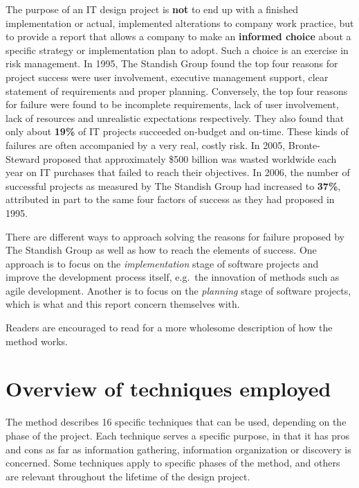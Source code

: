 The purpose of an IT design project is \textbf{not} to end up with a
finished implementation or actual, implemented alterations to company work
practice, but to provide a report that allows a company to make an
\textbf{informed choice} about a specific strategy or implementation plan to
adopt. Such a choice is an exercise in risk management. In 1995, The Standish
Group found the top four reasons for project success were user involvement,
executive management support, clear statement of requirements and proper
planning\cite{standish1995chaos}. Conversely, the top four reasons for failure
were found to be incomplete requirements, lack of user involvement, lack of
resources and unrealistic expectations respectively\cite{standish1995chaos}.
They also found that only about \textbf{19\%} of IT projects succeeded on-budget
and on-time. These kinds of failures are often accompanied by a very real, costly risk. 
In 2005, Bronte-Steward proposed that approximately \$500 billion was wasted
worldwide each year on IT purchases that failed to reach their
objectives\cite{bronte2005developing}. In 2006, the number of successful
projects as measured by The Standish Group\cite{standish2012} had increased to
\textbf{37\%}, attributed in part to the same four factors of success as they had
proposed in 1995. 

There are different ways to approach solving the reasons for
failure proposed by The Standish Group as well as how to reach the elements of
success. One approach is to focus on the \textit{implementation} stage of
software projects and improve the development process itself, e.g.\ the
innovation of methods such as agile development. Another is to focus on the
\textit{planning} stage of software projects, which is what \must{} and this
report concern themselves with.

Readers are encouraged to read \cite{bodker2004participatory} for a more
wholesome description of how the \must{} method works.

\section{Overview of techniques employed} \label{sec:overview}
The \must{} method describes 16 specific techniques that can be used, depending
on the phase of the project. Each technique serves a specific purpose, in that it
has pros and cons as far as information gathering, information organization or discovery
is concerned. Some techniques apply to specific phases of the \must{} method, and others
are relevant throughout the lifetime of the design project.

